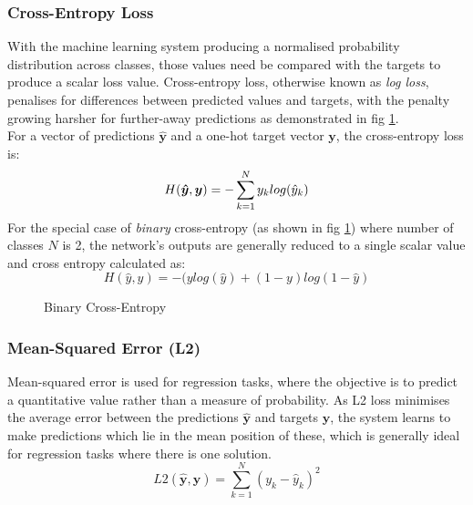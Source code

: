 \documentclass{report}
\begin{document}
	\subsubsection{Cross-Entropy Loss}	
	With the machine learning system producing a normalised probability distribution across classes, those values need be compared with the targets to produce a scalar loss value. 
	Cross-entropy loss, otherwise known as \textit{log loss}, penalises for differences between predicted values and targets, with the penalty growing harsher for further-away predictions as demonstrated in fig \ref{fig:cross-entropy:1}.\\
	For a vector of predictions $\bm{\hat{y}}$ and a one-hot target vector $\bm{y}$, the cross-entropy loss is:
	\begin{equation} \label{cross-entropy:1}
	H(\bm{\hat{y}}, \bm{y}) = - \sum_{k=1}^{N}y_k log(\hat{y}_k) \\
	\end{equation}  
	For the special case of \textit{binary} cross-entropy (as shown in fig \ref{fig:cross-entropy:1}) where number of classes $N$ is 2, the network's outputs are generally reduced to a single scalar value and cross entropy calculated as:
	\begin{equation} \label{cross-entropy:2}
	H(\hat{y}, y) = -(y log(\hat{y}) + (1 - y)log(1-\hat{y})
	\end{equation}
	\begin{figure}[!h]
		\centering
			\caption{Binary Cross-Entropy}
			\label{fig:cross-entropy:1}
	\end{figure}
	
	\subsubsection{Mean-Squared Error (L2)}
	Mean-squared error is used for regression tasks, where the objective is to predict a quantitative value rather than a measure of probability. As L2 loss minimises the average error between the predictions $\bm{\hat{y}}$ and targets $\bm{y}$, the system learns to make predictions which lie in the mean position of these, which is generally ideal for regression tasks where there is one solution.\\
	\begin{equation} \label{mean-squared-error:1}
	L2(\hat{\bm{y}}, \bm{y}) = \sum_{k=1}^{N}(y_k - \hat{y}_k)^2
	\end{equation}
	
\end{document}

